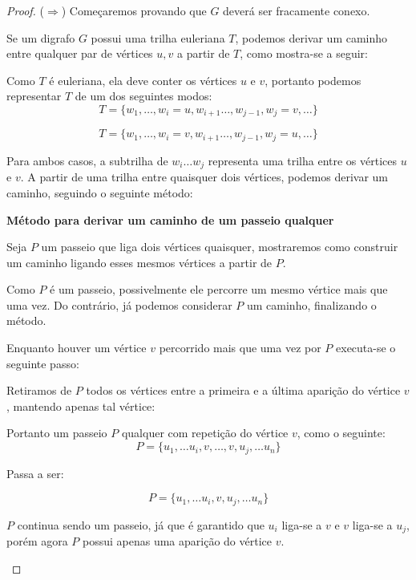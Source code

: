 \begin{proof} 

    ($\Rightarrow$) Começaremos provando que $G$ deverá ser fracamente conexo.

    Se um digrafo $G$ possui uma trilha euleriana $T$, podemos derivar um caminho entre qualquer par de vértices $u, v$ a partir de $T$, como mostra-se a seguir: 
    
    Como $T$ é euleriana, ela deve conter os vértices $u$ e $v$, portanto podemos representar $T$ de um dos seguintes modos:
    \[ T = \{w_1, \dots, w_i = u, w_{i+1} \dots, w_{j-1}, w_j = v, \dots \}\]

    \[ T = \{w_1, \dots, w_i = v, w_{i+1} \dots, w_{j-1}, w_j = u, \dots \}\]

    Para ambos casos, a subtrilha de $w_i \dots w_j$ representa uma trilha entre os vértices $u$ e $v$. 
    A partir de uma trilha entre quaisquer dois vértices, podemos derivar um caminho, seguindo o seguinte método:


        \begin{tcolorbox}
            \textbf{Método para derivar um caminho de um passeio qualquer}
            
            Seja $P$ um passeio que liga dois vértices quaisquer, mostraremos como construir um caminho ligando esses mesmos vértices a partir de $P$.

            Como $P$ é um passeio, possivelmente ele percorre um mesmo vértice mais que uma vez. Do contrário, já podemos considerar $P$ um caminho, finalizando o método. 

            Enquanto houver um vértice $v$ percorrido mais que uma vez por $P$ executa-se o seguinte passo:
    

            Retiramos de $P$ todos os vértices entre a primeira e a última aparição do vértice $v$, mantendo apenas tal vértice: 


            Portanto um passeio $P$ qualquer com repetição do vértice $v$, como o seguinte:
            \[
                P = \{ u_1, \dots u_i, v, \dots, v, u_j, \dots u_n\}
            \]

            Passa a ser:


            \[
                P = \{ u_1, \dots u_i, v, u_j, \dots u_n\}
            \]

            $P$ continua sendo um passeio, já que é garantido que $u_i$ liga-se a $v$ e $v$ liga-se a $u_j$, porém agora $P$ possui apenas uma aparição do vértice $v$.


\end{tcolorbox}
\end{proof}
